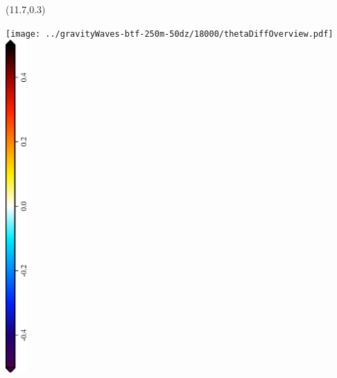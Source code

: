 \documentclass{article}
\begin{document}
\TPMargin{3pt}
\begin{textblock}{0.75}(11.7,0.3)
\end{textblock}
\centering
\texttt{[image: ../gravityWaves-btf-250m-50dz/18000/thetaDiffOverview.pdf]} \\
\includegraphics[height=5in,angle=270]{thetaDiffOverview_theta_diff.eps}
\end{document}
